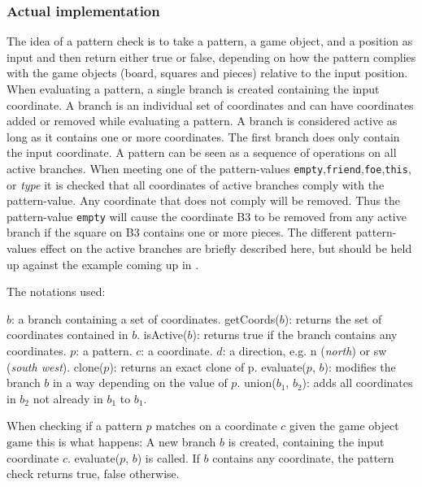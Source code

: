 \subsubsection{Actual implementation}
The idea of a pattern check is to take a pattern, a game object, and a position as input and then return either true or false, depending on how the pattern complies with the game objects (board, squares and pieces) relative to the input position.
When evaluating a pattern, a single branch is created containing the input coordinate. A branch is an individual set of coordinates and can have coordinates added or removed while evaluating a pattern. A branch is considered active as long as it contains one or more coordinates. The first branch does only contain the input coordinate. A pattern can be seen as a sequence of operations on all active branches.
When meeting one of the pattern-values \texttt{empty},\texttt{friend},\texttt{foe},\texttt{this}, or \textit{type} it is checked that all coordinates of active branches comply with the pattern-value. Any coordinate that does not comply will be removed. Thus the pattern-value \texttt{empty} will cause the coordinate B3 to be removed from any active branch if the square on B3 contains one or more pieces. The different pattern-values effect on the active branches are briefly described here, but should be held up against the example coming up in .

The notations used:

$b$: a branch containing a set of coordinates.
getCoords($b$): returns the set of coordinates contained in $b$.
isActive($b$): returns true if the branch contains any coordinates.
$p$: a pattern.
$c$: a coordinate.
$d$: a direction, e.g. n (\textit{north}) or sw (\textit{south west}).
clone($p$): returns an exact clone of p.
evaluate($p$, $b$): modifies the branch $b$ in a way depending on the value of $p$.
union($b_1$, $b_2$): adds all coordinates in $b_2$ not already in $b_1$ to $b_1$. 

When checking if a pattern $p$ matches on a coordinate $c$ given the game object $\text{game}$ this is what happens:
A new branch $b$ is created, containing the input coordinate $c$. 
evaluate($p$, $b$) is called. If $b$ contains any coordinate, the pattern check returns true, false otherwise.


